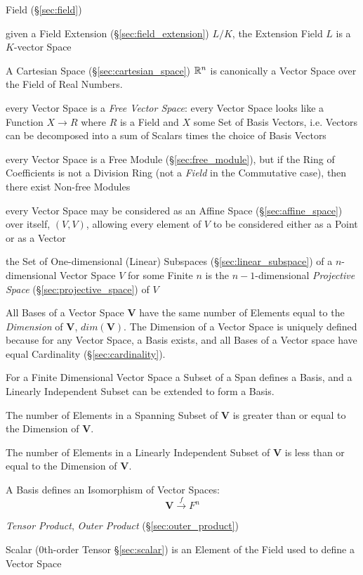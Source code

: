 Field (\S\ref{sec:field})

given a Field Extension (\S\ref{sec:field_extension}) $L/K$, the Extension Field
$L$ is a $K$-vector Space

A Cartesian Space (\S\ref{sec:cartesian_space}) $\mathbb{R}^n$ is canonically a
Vector Space over the Field of Real Numbers.

every Vector Space is a \emph{Free Vector Space}: every Vector Space
looks like a Function $X \rightarrow R$ where $R$ is a Field and $X$
some Set of Basis Vectors, i.e. Vectors can be decomposed into a sum
of Scalars times the choice of Basis Vectors %

every Vector Space is a Free Module (\S\ref{sec:free_module}), but if the Ring
of Coefficients is not a Division Ring (not a \emph{Field} in the Commutative
case), then there exist Non-free Modules

every Vector Space may be considered as an Affine Space
(\S\ref{sec:affine_space}) over itself, $(V,V)$, allowing every element of $V$
to be considered either as a Point or as a Vector

the Set of One-dimensional (Linear) Subspaces (\S\ref{sec:linear_subspace}) of a
$n$-dimensional Vector Space $V$ for some Finite $n$ is the $n-1$-dimensional
\emph{Projective Space} (\S\ref{sec:projective_space}) of $V$

All Bases of a Vector Space $\mathbf{V}$ have the same number of
Elements equal to the \emph{Dimension} of $\mathbf{V}$,
$dim(\mathbf{V})$. The Dimension of a Vector Space is uniquely defined
because for any Vector Space, a Basis exists, and all Bases of a
Vector space have equal Cardinality (\S\ref{sec:cardinality}).

For a Finite Dimensional Vector Space a Subset of a Span defines a
Basis, and a Linearly Independent Subset can be extended to form a
Basis.

The number of Elements in a Spanning Subset of $\mathbf{V}$ is greater
than or equal to the Dimension of $\mathbf{V}$.

The number of Elements in a Linearly Independent Subset of
$\mathbf{V}$ is less than or equal to the Dimension of $\mathbf{V}$.

A Basis defines an Isomorphism of Vector Spaces:
\[
    \mathbf{V} \xrightarrow{f} F^n
\]

\emph{Tensor Product}, \emph{Outer Product} (\S\ref{sec:outer_product})

Scalar (0th-order Tensor \S\ref{sec:scalar}) is an Element of the
Field used to define a Vector Space

